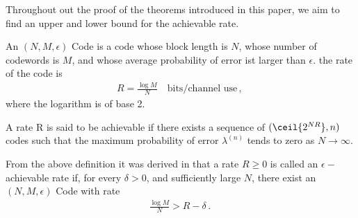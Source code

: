 Throughout out the proof of the theorems introduced in this paper, we aim to find an upper and lower bound for the achievable rate.
\begin{definition} {\cite[see ]{YS04}}
\label{Def.Rate}
An $(N,M,\epsilon)$ Code is a code whose block length is $N$, whose number of codewords is $M$, and whose average probability of error ist larger than $\epsilon$. the rate of the code is
\begin{align}
    R= \frac{\log{M}}{N} \quad \text{bits/channel use} \,,\,
\end{align}
where the logarithm is of base 2.
\end{definition}
\begin{definition}
\label{Def.Ach_Rate}
A rate R is said to be achievable if there exists a sequence of $(\ceil{2^{NR}},n)$ codes such that the maximum probability of error $\lambda^{(n)}$ tends to zero as $N\longrightarrow \infty$.
\end{definition}
From the above definition it was derived in \cite{YS04} that a rate $R \geq 0$ is called an $\epsilon-$achievable rate if, for every $\delta>0$, and sufficiently large $N$, there exist an $(N,M,\epsilon)$ Code with rate
 \begin{align}
    \label{Ineq.Achiev_Rate}
    \frac{\log{M}}{N} > R - \delta  \,.\,
\end{align}

